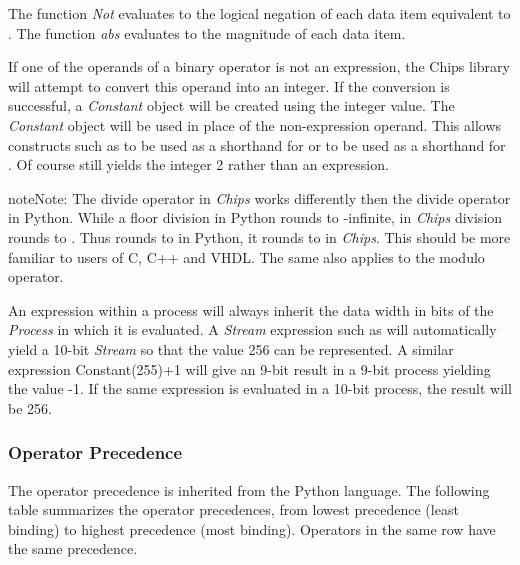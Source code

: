 \documentclass[letterpaper,10pt,english]{manual}
\begin{document}
The function \emph{Not} evaluates to the logical negation of each data item
equivalent to . The function \emph{abs} evaluates to the magnitude of each
data item.

If one of the operands of a binary operator is not an expression, the Chips
library will attempt to convert this operand into an integer. If the conversion
is successful, a \emph{Constant} object will be created using the integer value.
The \emph{Constant} object will be used in place of the non-expression operand. This
allows constructs such as  to be used as a shorthand for
 or  to be used
as a shorthand for .  Of course 
still yields the integer 2 rather than an expression.

\begin{notice}{note}{Note:}
The divide \code{//} operator in \emph{Chips} works differently then the divide
operator in Python.  While a floor division in Python rounds to -infinite,
in \emph{Chips} division rounds to . Thus  rounds to  in
Python, it rounds to  in \emph{Chips}. This should be more familiar to
users of C, C++ and VHDL. The same also applies to the modulo \code{\%}
operator.
\end{notice}

An expression within a process will always inherit the data width in bits of
the \emph{Process} in which it is evaluated. A \emph{Stream} expression such as
 will automatically yield a 10-bit \emph{Stream} so that the
value 256 can be represented. A similar expression Constant(255)+1 will give an
9-bit result in a 9-bit process yielding the value -1. If the same expression
is evaluated in a 10-bit process, the result will be 256.


\subsubsection{Operator Precedence}

The operator precedence is inherited from the Python language. The following
table summarizes the operator precedences, from lowest precedence (least
binding) to highest precedence (most binding). Operators in the same row have
the same precedence.
\end{document}
